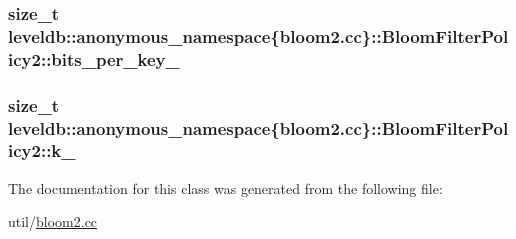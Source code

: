 \subsubsection[{bits\+\_\+per\+\_\+key\+\_\+}]{\setlength{\rightskip}{0pt plus 5cm}size\+\_\+t leveldb\+::anonymous\+\_\+namespace\{bloom2.\+cc\}\+::Bloom\+Filter\+Policy2\+::bits\+\_\+per\+\_\+key\+\_\+\hspace{0.3cm}{\ttfamily [private]}}\label{classleveldb_1_1anonymous__namespace_02bloom2_8cc_03_1_1_bloom_filter_policy2_ab36ca31b6a9acc336cb70c551531f25b}
\hypertarget{classleveldb_1_1anonymous__namespace_02bloom2_8cc_03_1_1_bloom_filter_policy2_ab7d3a45900bf6116990a6d8bc4d9c490}{}
\subsubsection[{k\+\_\+}]{\setlength{\rightskip}{0pt plus 5cm}size\+\_\+t leveldb\+::anonymous\+\_\+namespace\{bloom2.\+cc\}\+::Bloom\+Filter\+Policy2\+::k\+\_\+\hspace{0.3cm}{\ttfamily [private]}}\label{classleveldb_1_1anonymous__namespace_02bloom2_8cc_03_1_1_bloom_filter_policy2_ab7d3a45900bf6116990a6d8bc4d9c490}


The documentation for this class was generated from the following file\+:\begin{DoxyCompactItemize}
\item 
util/\hyperlink{bloom2_8cc}{bloom2.\+cc}\end{DoxyCompactItemize}
